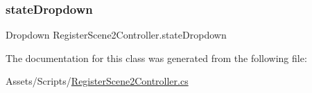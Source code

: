 \mbox{\label{classRegisterScene2Controller_ae3a80578aa69ac34d7976db3d6181213}} 
\subsubsection{\texorpdfstring{state\+Dropdown}{stateDropdown}}
{\footnotesize\ttfamily Dropdown Register\+Scene2\+Controller.\+state\+Dropdown}



The documentation for this class was generated from the following file\+:\begin{DoxyCompactItemize}
\item 
Assets/\+Scripts/\hyperlink{RegisterScene2Controller_8cs}{Register\+Scene2\+Controller.\+cs}\end{DoxyCompactItemize}
